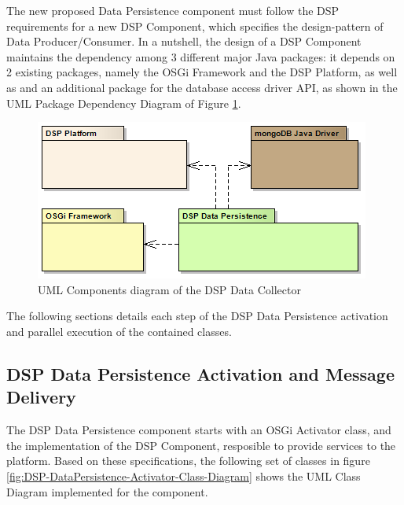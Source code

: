The new proposed Data Persistence component must follow the DSP requirements
for a new DSP Component, which specifies the design-pattern of Data
Producer/Consumer. In a nutshell, the design of a DSP Component maintains the
dependency among 3 different major Java packages: it depends on 2 existing
packages, namely the OSGi Framework and the DSP Platform, as well as and an
additional package for the database access driver API, as shown in the UML
Package Dependency Diagram \cite{uml} of Figure
\ref{fig:DSP-Data-Persistence-Packages-Dependency}.

\begin{figure}[!h]
  \centering
  \includegraphics[scale=0.5]{../diagrams/DSP-Data-Persistence-Packages-Dependency}
  \caption{UML Components diagram of the DSP Data Collector}
  \label{fig:DSP-Data-Persistence-Packages-Dependency}
\end{figure}

The following sections details each step of the DSP Data Persistence activation
and parallel execution of the contained classes.

\subsection{DSP Data Persistence Activation and Message Delivery}

The DSP Data Persistence component starts with an OSGi Activator class, and the
implementation of the DSP Component, resposible to provide services to the
platform. Based on these specifications, the following set of classes in
figure \ref{fig:DSP-DataPersistence-Activator-Class-Diagram} shows the UML
Class Diagram \cite{uml} implemented for the component.

